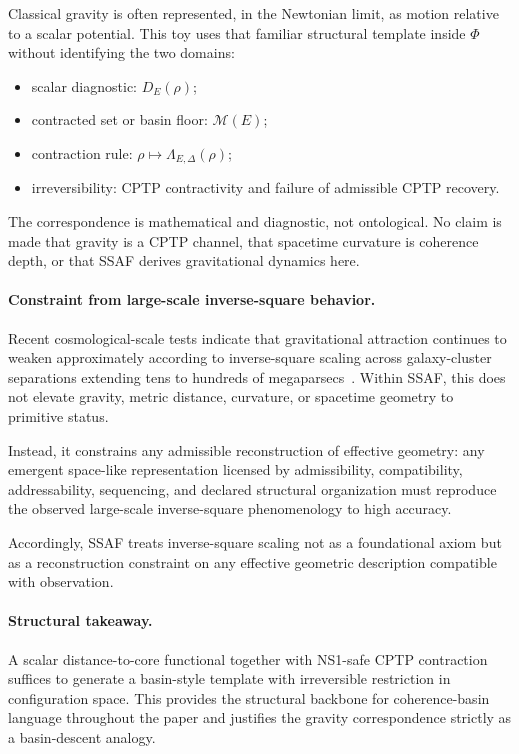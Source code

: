 \documentclass[aps,prx,onecolumn,11pt]{revtex4-2}
\theoremstyle{plain}
\theoremstyle{definition}
\theoremstyle{remark}
\begin{document}
Classical gravity is often represented, in the Newtonian limit, as
motion relative to a scalar potential. This toy uses that familiar
structural template inside \(\Phi\) without identifying the two domains:

\begin{itemize}
\item scalar diagnostic: \(D_E(\rho)\);
\item contracted set or basin floor: \(\mathcal M(E)\);
\item contraction rule: \(\rho\mapsto\Lambda_{E,\Delta}(\rho)\);
\item irreversibility: CPTP contractivity and failure of admissible
CPTP recovery.
\end{itemize}

The correspondence is mathematical and diagnostic, not ontological.
No claim is made that gravity is a CPTP channel, that spacetime
curvature is coherence depth, or that SSAF derives gravitational
dynamics here.

\paragraph{Constraint from large-scale inverse-square behavior.}

Recent cosmological-scale tests indicate that gravitational attraction
continues to weaken approximately according to inverse-square scaling
across galaxy-cluster separations extending tens to hundreds of
megaparsecs~\cite{Gallardo2026GravityForceLaw}. Within SSAF, this does
not elevate gravity, metric distance, curvature, or spacetime geometry
to primitive status.

Instead, it constrains any admissible reconstruction of effective
geometry: any emergent space-like representation licensed by
admissibility, compatibility, addressability, sequencing, and declared
structural organization must reproduce the observed large-scale
inverse-square phenomenology to high accuracy.

Accordingly, SSAF treats inverse-square scaling not as a foundational
axiom but as a reconstruction constraint on any effective geometric
description compatible with observation.

\paragraph{Structural takeaway.}

A scalar distance-to-core functional together with NS1-safe CPTP
contraction suffices to generate a basin-style template with
irreversible restriction in configuration space. This provides the
structural backbone for coherence-basin language throughout the paper
and justifies the gravity correspondence strictly as a basin-descent
analogy.
\end{document}
